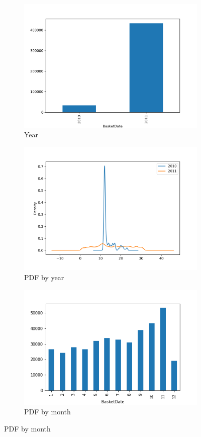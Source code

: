 \begin{figure}[!h]
\begin{subfigure}{.5\textwidth}
\centering
\includegraphics[width=.7\textwidth]{img/year_bar.png}
\caption{Year}
\label{fig:year_bar}
\end{subfigure}
\begin{subfigure}{.5\textwidth}
\centering
\includegraphics[width=.7\textwidth]{img/year_kde.png}
\caption{PDF by year}
\label{fig:year_kde}
\end{subfigure}
\begin{subfigure}{.33\textwidth}
\centering
\includegraphics[width=.7\textwidth]{img/month_bar.png}
\caption{PDF by month}
\label{fig:month_bar}

\end{subfigure}
\end{figure}

